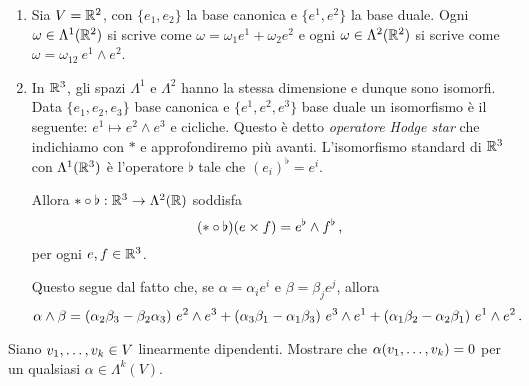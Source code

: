 \begin{example}
	\begin{enumerate}
		\item Sia $V = \R^2$, con $\{e_1,e_2\}$ la base canonica e $\{e^1,e^2\}$ la base duale. Ogni $\omega\in\Lambda^1(\R^2)$ si scrive come $\omega = \omega_1e^1+\omega_2e^2$ e ogni $\omega\in\Lambda^2(\R^2)$ si scrive come $\omega = \omega_{12}\ e^1\wedge e^2$. 
		
		\item In $\R^3$, gli spazi $\Lambda^1$ e $\Lambda^2$ hanno la stessa dimensione e dunque sono isomorfi. Data $\{e_1,e_2,e_3\}$ base canonica e $\{e^1,e^2,e^3\}$ base duale un isomorfismo è il seguente: $e^1\mapsto e^2\wedge e^3$ e cicliche.
		Questo è detto \emph{operatore Hodge star} che indichiamo con $*$ e approfondiremo più avanti. L'isomorfismo standard di $\R^3$ con $\Lambda^1(\R^3)$ è l'operatore $\flat$ tale che $(e_i)^\flat = e^i$. %
		
		Allora $*\circ \flat:\R^3\to \Lambda^2(\R)$ soddisfa
		\begin{equation*}
			(*\circ \flat) (e\times f) = e^\flat \wedge f^\flat \virgola
		\end{equation*}
		per ogni $e,f \in \R^3$.
		
		Questo segue dal fatto che, se $\alpha = \alpha_ie^i$ e $\beta = \beta_j e^j$, allora
		\begin{equation*}
			\alpha\wedge\beta = (\alpha_2\beta_3 - \beta_2\alpha_3)\ e^2\wedge e^3 + (\alpha_3\beta_1 - \alpha_1\beta_3)\ e^3\wedge e^1 + (\alpha_1\beta_2 - \alpha_2\beta_1)\ e^1\wedge e^2 \punto
		\end{equation*}
	\end{enumerate}
\end{example}

\begin{exercise}
	Siano $\seqb vk, \in V$ linearmente dipendenti. Mostrare che $\alpha(\seqb vk,) = 0$ per un qualsiasi $\alpha\in\Lambda^k(V)$. 
\end{exercise}


